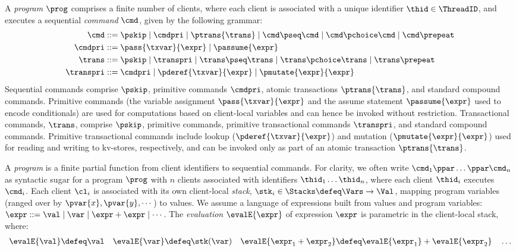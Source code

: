  A 
\emph{program} \( \prog \) comprises a finite number of clients,
where each client is associated with a unique identifier \( \thid \in \ThreadID \), 
and executes a sequential \emph{command} $\cmd$, given by the following grammar:
\begin{align*}
\cmd & ::=  
\pskip \mid 
\cmdpri \mid  
\ptrans{\trans} \mid 
\cmd \pseq \cmd \mid 
\cmd \pchoice \cmd \mid 
\cmd \prepeat  
\\
\cmdpri & ::=  
\pass{\txvar}{\expr} \mid 
\passume{\expr} 
\\
\trans & ::=
\pskip \mid
\transpri \mid 
\trans \pseq \trans \mid
\trans \pchoice \trans \mid
\trans\prepeat    
\\
\transpri & ::= 
\cmdpri \mid
\pderef{\txvar}{\expr} \mid
\pmutate{\expr}{\expr} 
\end{align*} 
%
%
%
Sequential commands  comprise $\pskip$,  primitive commands $\cmdpri
$, atomic transactions
$\ptrans{\trans}$,  and standard
compound commands. 
Primitive commands (the variable assignment
$\pass{\txvar}{\expr}$ and the assume statement $\passume{\expr}$
used to encode conditionals) are used for computations based on 
client-local variables 
and can hence be invoked without restriction. 
Transactional commands, $\trans$, 
comprise $\pskip$, primitive commands, 
primitive transactional commands $\transpri$,  and standard compound commands. 
Primitive transactional commands include lookup ($\pderef{\txvar}{\expr}$) and mutation 
($\pmutate{\expr}{\expr}$) used for reading and writing to kv-stores, respectively, and  
can be invoked only as part of an atomic transaction $\ptrans{\trans}$.

A {\em program} is a finite partial function from client identifiers to sequential
commands.
For clarity, we often write \( \cmd_{1}\ppar \dots \ppar \cmd_{n}\) as syntactic sugar 
for a program \( \prog \) with $n$ clients associated with identifiers
$\thid_1 \dots \thid_n$, where each client $\thid_i$ executes
$\cmd_i$. 
Each client $\cl_i$ is associated with its own client-local  \emph{stack}, 
$\stk_i \in \Stacks \defeq \Vars \to \Val$,  mapping program variables
(ranged over by $\pvar{x}, \pvar{y}, \cdots$)
to values. 
We assume a language of expressions built from values
and program variables:
$\expr ::= \val \mid \var \mid \expr + \expr \mid \cdots$.
The \emph{evaluation} $\evalE{\expr}$ of  expression $\expr$ is parametric in
the client-local stack, where:
\begin{gather*}
\evalE{\val} \defeq
\val
\quad
\evalE{\var} \defeq
\stk(\var)
\quad
\evalE{\expr_{1} + \expr_{2}} \defeq
\evalE{\expr_{1}} + \evalE{\expr_{2}}
\quad
\dots
\end{gather*}

